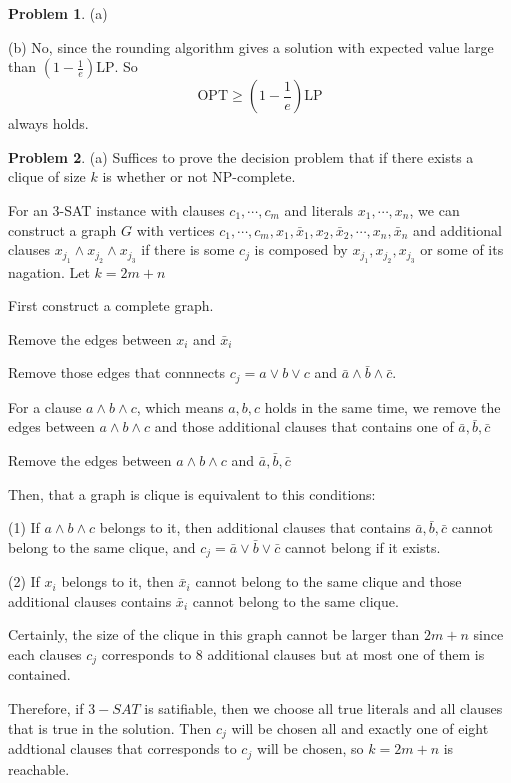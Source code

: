 \documentclass[a4paper]{article}
\theoremstyle{definition}
\newtheorem{problem}{Problem}
\theoremstyle{plain}
\newcommand{\OPT}{\mathrm{OPT}}
\numberwithin{equation}{problem}
\begin{document}
\begin{problem}
  (a)
  

  (b) No, since the rounding algorithm gives a solution with expected value large than  $ (1-\frac{1}{e})\mathrm{LP} $. So 
  \[\OPT \geq (1-\frac{1}{e})\mathrm{LP}\]
  always holds. 
\end{problem}

\begin{problem}
  (a)  Suffices to prove the decision problem that if there exists a clique of size  $ k $ is whether or not NP-complete.

  For an 3-SAT instance  with clauses  $ c_1,\cdots,c_m $ and literals $ x_1,\cdots,x_n $, we can construct a graph  $ G $ with vertices  $ c_1,\cdots,c_m,x_1,\bar{x}_1,x_2,\bar{x}_2,\cdots,x_n,\bar{x}_n $ and additional clauses  $ x_{j_1}\wedge x_{j_2}\wedge x_{j_3} $ if  there is some  $ c_j $ is composed by $ x_{j_1},x_{j_2},x_{j_3} $ or  some of its nagation.   Let  $ k=2m+n $  
  
  First construct a complete graph. 
  
  Remove the edges between  $ x_i $ and  $ \bar{x}_i $  

  Remove those edges that connnects  $ c_j=a\vee  b\vee c  $ and  $ \bar{a}\wedge \bar{b}\wedge \bar{c} $.

  For a clause  $ a\wedge b\wedge c $, which means  $ a,b,c $ holds in the same time, we remove the edges between  $ a\wedge b\wedge c $ and those additional clauses that contains one of  $ \bar{a},\bar{b},\bar{c}$     

  Remove the edges between  $ a\wedge b\wedge c $ and  $ \bar{a},\bar{b},\bar{c} $  
  
  Then, that a graph is clique is equivalent to this conditions:

  (1) If  $ a\wedge b\wedge c $ belongs to it, then additional clauses that contains  $ \bar{a},\bar{b},\bar{c} $ cannot belong to the same clique, and  $ c_j=\bar{a}\vee \bar{b}\vee\bar{c} $ cannot belong if it exists.
  
  (2) If  $ x_i $ belongs to it, then  $ \bar{x}_i $ cannot belong to the same clique and those additional clauses contains  $ \bar{x}_i $   cannot belong to the same clique.


  Certainly, the size of the clique in this graph cannot be larger than  $ 2m+n $ since each clauses  $ c_j $  corresponds to  $ 8 $ additional clauses but at most one of them is contained. 
   
  Therefore, if  $ 3-SAT $ is satifiable, then we  choose all  true literals and   all clauses that is true in the solution. Then  $ c_j $ will be chosen all and exactly one of eight addtional clauses that corresponds to  $ c_j $ will be chosen, so  $ k=2m+n $ is reachable. 
  

\end{problem}
\end{document}
